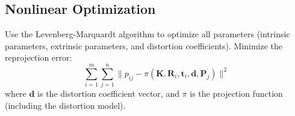 \documentclass{article}
\begin{document}
\subsection{Nonlinear Optimization}
Use the Levenberg-Marquardt algorithm to optimize all parameters (intrinsic parameters, extrinsic parameters, and distortion coefficients). Minimize the reprojection error:
\[
\sum_{i=1}^m \sum_{j=1}^n \| p_{ij} - \pi(\mathbf{K}, \mathbf{R}_i, \mathbf{t}_i, \mathbf{d}, \mathbf{P}_j) \|^2
\]
where \(\mathbf{d}\) is the distortion coefficient vector, and \(\pi\) is the projection function (including the distortion model).











\end{document}
